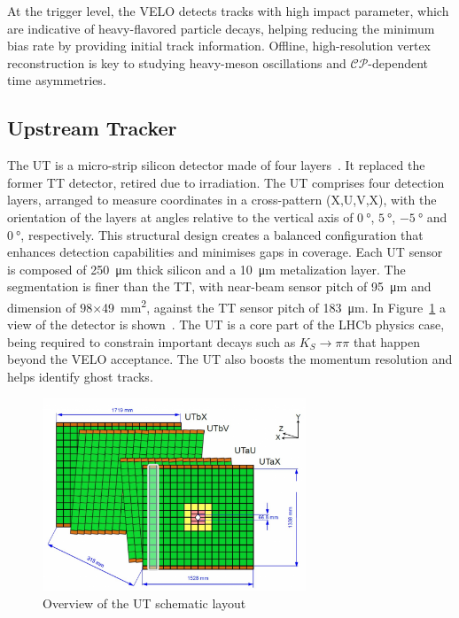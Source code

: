 At the trigger level, the VELO detects tracks with high impact parameter, which are indicative of heavy-flavored particle decays, helping reducing the minimum bias rate by providing initial track information. Offline, high-resolution vertex reconstruction is key to studying heavy-meson oscillations and $\mathcal{CP}$-dependent time asymmetries.

\subsection{Upstream Tracker}
The UT is a micro-strip silicon detector made of four layers~\cite{LHCb:2014uqj}. It replaced the former TT detector, retired due to irradiation. The UT comprises four detection layers, arranged to measure coordinates in a cross-pattern (X,U,V,X), with the orientation of the layers at angles relative to the vertical axis of $\SI{0}{\degree}$, $\SI{+5}{\degree}$, $\SI{-5}{\degree}$ and $\SI{0}{\degree}$, respectively. This structural design  creates a balanced configuration that enhances detection capabilities and minimises gaps in coverage. Each UT sensor is composed of \SI{250}{\micro\meter} thick silicon and a \SI{10}{\micro\meter} metalization layer. The segmentation is finer than the TT, with near-beam sensor pitch of \SI{95}{\micro\meter} and dimension of $98$×\SI{49}{\milli\meter\squared}, against the TT sensor pitch of \SI{183}{\micro\meter}. In Figure~\ref{fig:UT} a view of the detector is shown~\cite{ut}. 
The UT is a core part of the LHCb physics case, being required to constrain important decays such as $K_S \rightarrow\pi\pi$ that happen beyond the VELO acceptance. The UT also boosts the momentum resolution and helps identify ghost tracks.

\begin{figure}
    \centering
    \includegraphics[width=0.7\textwidth]{figures/UT.png}
    \caption{Overview of the UT schematic layout}
    \label{fig:UT}
\end{figure}

